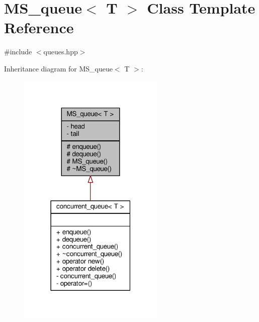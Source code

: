 \hypertarget{classMS__queue}{\section{M\-S\-\_\-queue$<$ T $>$ Class Template Reference}
\label{classMS__queue}
}


{\ttfamily \#include $<$queues.\-hpp$>$}



Inheritance diagram for M\-S\-\_\-queue$<$ T $>$\-:
\nopagebreak
\begin{figure}[H]
\begin{center}
\leavevmode
\includegraphics[width=198pt]{classMS__queue__inherit__graph}
\end{center}
\end{figure}


